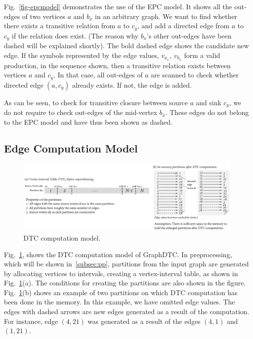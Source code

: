\documentclass[10pt,preprint]{sigplanconf}
\begin{document}
Fig.~\ref{fig-epcmodel} demonstrates the use of the EPC model. It shows all the out-edges of two vertices $a$ and $b_x$ in an arbitrary graph. We want to find whether there exists a transitive relation from $a$ to $c_y$, and add a directed edge from $a$ to $c_y$ if the relation does exist. (The reason why $b_x$'s other out-edges have been dashed will be explained shortly). The bold dashed edge shows the candidate new edge. If the symbols represented by the edge values, $v_{a_x}$, $v_{b_x}$ form a valid production, in the sequence shown, then a transitive relation exists between vertices $a$ and $c_y$. In that case, all out-edges of $a$ are scanned to check whether directed edge $(a,c_y)$ already exists. If not, the edge is added. 

As can be seen, to check for transitive closure between source $a$ and sink $c_y$, we do not require to check out-edges of the mid-vertex $b_x$. These edges do not belong to the EPC model and have thus been shown as dashed.      

\subsection{Edge Computation Model}
\label{subsec:ecm}

\begin{figure}[!htbp]
	\begin{center}
		\includegraphics[scale=0.4]{Figures/dtccompmodel.pdf}
	\end{center}
	\caption{DTC computation model.}
	\label{fig-dtccompmodel}
\end{figure}

Fig.~\ref{fig-dtccompmodel}, shows the DTC computation model of GraphDTC. In preprocessing, which will be shown in~\ref{subsec:pp}, partitions from the input graph are generated by allocating vertices to intervals, creating a vertex-interval table, as shown in Fig.~\ref{fig-dtccompmodel}(a). The conditions for creating the partitions are also shown in the figure. Fig.~\ref{fig-dtccompmodel}(b) shows an example of two partitions on which DTC computation has been done in the memory. In this example, we have omitted edge values. The edges with dashed arrows are new edges generated as a result of the computation. For instance, edge $(4, 21)$ was generated as a result of the edges $(4, 1)$ and $(1, 21)$. 
\end{document}
